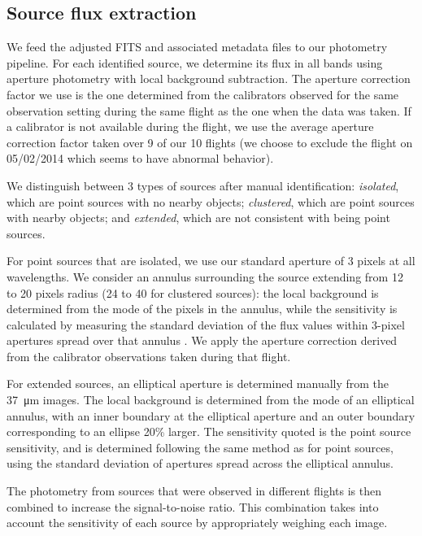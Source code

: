 \subsection{Source flux extraction}

We feed the adjusted FITS and associated metadata files to our photometry pipeline. For each identified source, we determine its flux in all bands using aperture photometry with local background subtraction. The aperture correction factor we use is the one determined from the calibrators observed for the same observation setting during the same flight as the one when the data was taken. If a calibrator is not available during the flight, we use the average aperture correction factor taken over 9 of our 10 flights (we choose to exclude the flight on 05/02/2014 which seems to have abnormal behavior).

We distinguish between 3 types of sources after manual identification: \textit{isolated}, which are point sources with no nearby objects; \textit{clustered}, which are point sources with nearby objects; and \textit{extended}, which are not consistent with being point sources. 

For point sources that are isolated, we use our standard aperture of 3 pixels at all wavelengths. We consider an annulus surrounding the source extending from 12 to 20 pixels radius (24 to 40 for clustered sources): the local background is determined from the mode of the pixels in the annulus, while the sensitivity is calculated by measuring the standard deviation of the flux values within 3-pixel apertures spread over that annulus \citep{Shimizu:2016if}. We apply the aperture correction derived from the calibrator observations taken during that flight.

For extended sources, an elliptical aperture is determined manually from the \SI{37}{\micro\meter} images. The local background is determined from the mode of an elliptical annulus, with an inner boundary at the elliptical aperture and an outer boundary corresponding to an ellipse 20\% larger. The sensitivity quoted is the point source sensitivity, and is determined following the same method as for point sources, using the standard deviation of apertures spread across the elliptical annulus. 

The photometry from sources that were observed in different flights is then combined to increase the signal-to-noise ratio. This combination takes into account the sensitivity of each source by appropriately weighing each image.

